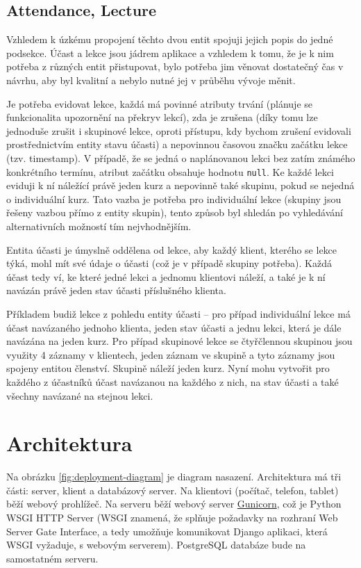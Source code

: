         \subsection{Attendance, Lecture}
        Vzhledem k úzkému propojení těchto dvou entit spojuji jejich popis do jedné podsekce. Účast a lekce jsou jádrem aplikace a vzhledem k tomu, že je k nim potřeba z různých entit přistupovat, bylo potřeba jim věnovat dostatečný čas v návrhu, aby byl kvalitní a nebylo nutné jej v průběhu vývoje měnit.
        
        Je potřeba evidovat lekce, každá má povinné atributy trvání (plánuje se funkcionalita upozornění na překryv lekcí), zda je zrušena (díky tomu lze jednoduše zrušit i skupinové lekce, oproti přístupu, kdy bychom zrušení evidovali prostřednictvím entity stavu účasti) a nepovinnou časovou značku začátku lekce (tzv. timestamp). V případě, že se jedná o naplánovanou lekci bez zatím známého konkrétního termínu, atribut začátku obsahuje hodnotu \verb|null|. Ke každé lekci eviduji k ní náležící právě jeden kurz a nepovinně také skupinu, pokud se nejedná o individuální kurz. Tato vazba je potřeba pro individuální lekce (skupiny jsou řešeny vazbou přímo z entity skupin), tento způsob byl shledán po vyhledávání alternativních možností tím nejvhodnějším.
        
        Entita účasti je úmyslně oddělena od lekce, aby každý klient, kterého se lekce týká, mohl mít své údaje o účasti (což je v případě skupiny potřeba). Každá účast tedy ví, ke které jedné lekci a jednomu klientovi náleží, a také je k ní navázán právě jeden stav účasti příslušného klienta.
        
        Příkladem budiž lekce z pohledu entity účasti -- pro případ individuální lekce má účast navázaného jednoho klienta, jeden stav účasti a jednu lekci, která je dále navázána na jeden kurz. Pro případ skupinové lekce se čtyřčlennou skupinou jsou využity 4 záznamy v klientech, jeden záznam ve skupině a tyto záznamy jsou spojeny entitou členství. Skupině náleží jeden kurz. Nyní mohu vytvořit pro každého z účastníků účast navázanou na každého z nich, na stav účasti a také všechny navázané na stejnou lekci.
        

    \section{Architektura}\label{architektura}
    Na obrázku \ref{fig:deployment-diagram} je diagram nasazení. Architektura má tři části: server, klient a databázový server. Na klientovi (počítač, telefon, tablet) běží webový prohlížeč. Na serveru běží webový server \href{http://gunicorn.org/}{Gunicorn}, což je Python WSGI HTTP Server (WSGI znamená, že splňuje požadavky na rozhraní Web Server Gate Interface, a tedy umožňuje komunikovat Django aplikaci, která WSGI vyžaduje, s webovým serverem). PostgreSQL databáze bude na samostatném serveru.
    
